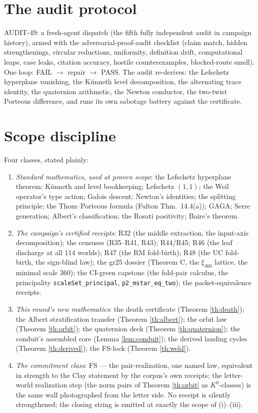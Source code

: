\documentclass[11pt]{article}
\begin{document}
\section{The audit protocol}

AUDIT-49: a fresh-agent dispatch (the fifth fully independent audit in
campaign history), armed with the adversarial-proof-audit checklist
(claim match, hidden strengthenings, circular reductions, uniformity,
definition drift, computational leaps, case leaks, citation accuracy,
hostile counterexamples, blocked-route smell). One loop: FAIL
$\to$ repair $\to$ PASS. The audit re-derives: the Lefschetz
hyperplane vanishing, the K\"unneth level decomposition, the
alternating trace identity, the quaternion arithmetic, the Newton
conductor, the two-twist Porteous difference, and runs its own
sabotage battery against the certificate.

\section{Scope discipline}

Four classes, stated plainly:
\begin{enumerate}[label=(\alph*)]
\item \emph{Standard mathematics, used at proven scope}: the Lefschetz
hyperplane theorem; K\"unneth and level bookkeeping; Lefschetz
$(1,1)$; the Weil operator's type action; Galois descent; Newton's
identities; the splitting principle; the Thom--Porteous formula
(Fulton Thm.~14.4(a)); GAGA; Serre generation; Albert's
classification; the Rosati positivity; Baire's theorem.
\item \emph{The campaign's certified receipts}: R32 (the middle
extraction, the input-axis decomposition); the censuses (R35--R41,
R43); R44/R45; R46 (the leaf discharge at all $114$ worlds); R47 (the
RM fold-birth); R48 (the UC fold-birth, the sign-blind law); the gr25
dossier (Theorem C, the $\xi_{360}$ lattice, the minimal scale
$360$); the CI-green capstone (the fold-pair calculus, the
principality \texttt{scaleSet\_principal}, \texttt{p2\_mstar\_eq\_two});
the packet-equivalence receipts.
\item \emph{This round's new mathematics}: the death certificate
(Theorem \ref{th:death}); the Albert stratification transfer
(Theorem \ref{th:albert}); the orbit law (Theorem \ref{th:orbit}); the
quaternion deck (Theorem \ref{th:quaternion}); the conduit's
assembled core (Lemma \ref{lem:conduit}); the derived landing cycles
(Theorem \ref{th:derived}); the FS-lock (Theorem \ref{th:weld}).
\item \emph{The commitment class}: FS --- the pair-realization, one
named law, equivalent in strength to the Clay statement by the
corpus's own receipts; the letter-world realization step (the norm
pairs of Theorem \ref{th:orbit} as $K^0$-classes) is the same wall
photographed from the letter side. No receipt is silently
strengthened; the closing string is emitted at exactly the scope of
(i)--(iii).
\end{enumerate}
\end{document}
